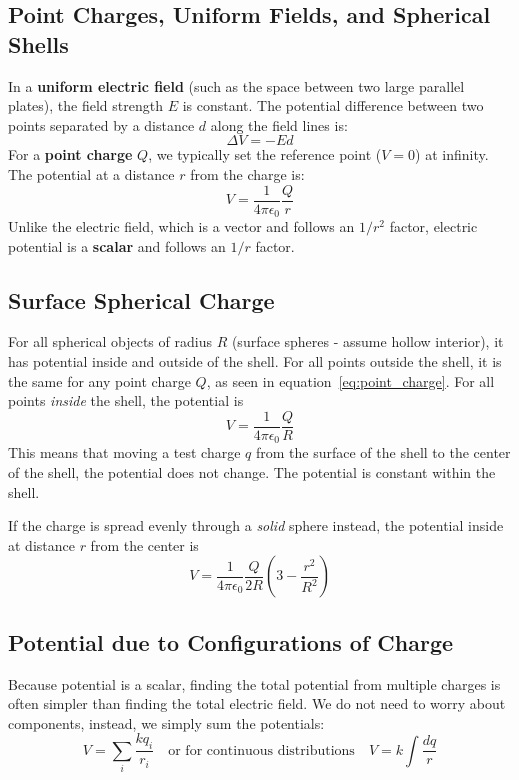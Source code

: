 \subsection{Point Charges, Uniform Fields, and Spherical Shells}
In a \textbf{uniform electric field} (such as the space between two large parallel plates), the field strength $E$ is constant. The potential difference between two points separated by a distance $d$ along the field lines is:
\begin{equation}
    \Delta V = -Ed
\end{equation}
For a \textbf{point charge} $Q$, we typically set the reference point ($V=0$) at infinity. The potential at a distance $r$ from the charge is:
\begin{equation}
    V = \frac{1}{4\pi\epsilon_0} \frac{Q}{r}
	\label{eq:point_charge}
\end{equation}
Unlike the electric field, which is a vector and follows an $1/r^2$ factor, electric potential is a \textbf{scalar} and follows an $1/r$ factor.
\subsection*{Surface Spherical Charge}
For all spherical objects of radius $R$ (surface spheres - assume hollow interior), it has potential inside and outside of the shell. For all points outside the shell, it is the same for any point charge $Q$, as seen in equation~\ref{eq:point_charge}. For all points \emph{inside} the shell, the potential is
$$V = \frac{1}{4\pi\epsilon_0} \frac{Q}{R}$$
This means that moving a test charge $q$ from the surface of the shell to the center of the shell, the potential does not change. The potential is constant within the shell.

If the charge is spread evenly through a \emph{solid} sphere instead, the
potential inside at distance $r$ from the center is
$$V = \frac{1}{4\pi\epsilon_0}\frac{Q}{2R} \left(3 - \frac{r^2}{R^2}\right)$$

\subsection{Potential due to Configurations of Charge}
Because potential is a scalar, finding the total potential from multiple charges is often simpler than finding the total electric field. We do not need to worry about components, instead, we simply sum the potentials:
\begin{equation}
    V = \sum_i \frac{k q_i}{r_i} \quad \text{or for continuous distributions} \quad V = k \int \frac{dq}{r}
\end{equation}


